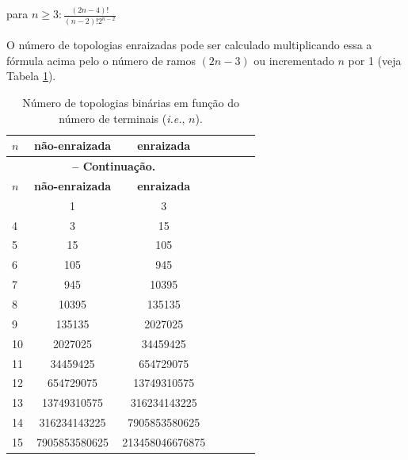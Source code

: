 \begin{refsection}
\begin{center}
	para $n\geq3\colon\frac{(2n-4)!}{(n-2)!2^{n-2}}$
\end{center}
	
	O número de topologias enraizadas pode ser calculado multiplicando essa a fórmula acima pelo o número de ramos $(2n-3)$ ou incrementado $n$ por 1 (veja Tabela \ref{tut3:table:enumeration}).



\pagestyle{fancy}
\begin{center}

\begin{longtable}{lcccccc}
\caption[Tabela \ref{tut3:table:enumeration}: Enumeração de topologias]{Número de topologias binárias em função do número de terminais (\textit{i.e.}, $n$).} \label{tut3:table:enumeration} \\


\hline\hline  \textbf{$n$} & \textbf{não-enraizada} & \textbf{enraizada}\\
\hline
\endfirsthead

\multicolumn{3}{c}{{\bfseries \tablename\ \thetable{} -- Continuação.}}\\
\hline\hline \textbf{$n$} & \textbf{não-enraizada} & \textbf{enraizada}\\

\endhead
\hline \hline
\endlastfoot
3 & 1 & 3\\
4 & 3 & 15\\
5 & 15 & 105\\
6 & 105 & 945\\
7 & 945 & 10395\\
8 & 10395 & 135135\\
9 & 135135 & 2027025\\
10 & 2027025 & 34459425\\
11 & 34459425 & 654729075\\
12 & 654729075 & 13749310575\\
13 & 13749310575 & 316234143225\\
14 & 316234143225 & 7905853580625\\
15 & 7905853580625 & 213458046676875\\


\end{longtable}
\end{center}
\end{refsection}
